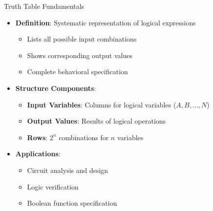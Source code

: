 \documentclass[aspectratio=169,11pt]{beamer}
\newcommand{\concept}[1]{\textbf{\color{accentcolor}#1}}
\begin{document}
\begin{frame}{Truth Table Fundamentals}
\begin{itemize}
\item \concept{Definition}: Systematic representation of logical expressions
\begin{itemize}
\item Lists all possible input combinations
\item Shows corresponding output values
\item Complete behavioral specification
\end{itemize}
\vspace{0.5cm}
\item \concept{Structure Components}:
\begin{itemize}
\item \textbf{Input Variables}: Columns for logical variables ($A, B, \ldots, N$)
\item \textbf{Output Values}: Results of logical operations
\item \textbf{Rows}: $2^n$ combinations for $n$ variables
\end{itemize}
\vspace{0.3cm}
\item \concept{Applications}:
\begin{itemize}
\item Circuit analysis and design
\item Logic verification
\item Boolean function specification
\end{itemize}
\end{itemize}
\end{frame}
\end{document}
